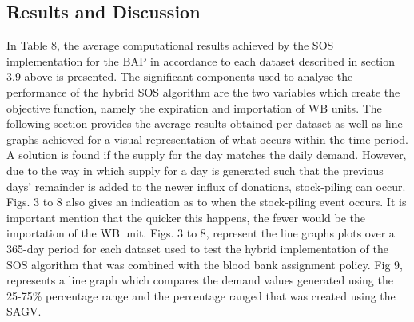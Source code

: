 \documentclass{article}
\begin{document}
\subsection{Results and Discussion}
In Table 8, the average computational results achieved by the SOS implementation for the BAP in accordance to each dataset described in section 3.9 above is presented. The significant components used to analyse the performance of the hybrid SOS algorithm are the two variables which create the objective function, namely the expiration and importation of WB units. The following section provides the average results obtained per dataset as well as line graphs achieved for a visual representation of what occurs within the time period. A solution is found if the supply for the day matches the daily demand. However, due to the way in which supply for a day is generated such that the previous days’ remainder is added to the newer influx of donations, stock-piling can occur. Figs. 3 to 8 also gives an indication as to when the stock-piling event occurs. It is important mention that the quicker this happens, the fewer would be the importation of the WB unit. Figs. 3 to 8, represent the line graphs plots over a 365-day period for each dataset used to test the hybrid implementation of the SOS algorithm that was combined with the blood bank assignment policy. Fig 9, represents a line graph which compares the demand values generated using the 25-75\% percentage range and the percentage ranged that was created using the SAGV. 
\end{document}
